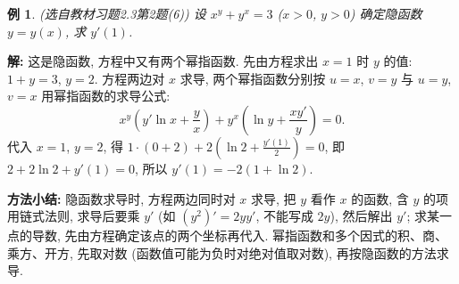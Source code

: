 \documentclass[UTF8,openany]{ctexbook}
\theoremstyle{chinesetextbook}
\newtheorem{example}{例}[section]
\newenvironment{cnsolution}{\par\indent\textbf{解:} \ignorespaces}{\par}
\begin{document}
\begin{example}\label{ex:c2-h3-2}
\textnormal{(选自教材习题2.3第2题(6))} 设 $x^y+y^x=3$ ($x>0$, $y>0$) 确定隐函数 $y=y(x)$, 求 $y'(1)$.
\end{example}
\begin{cnsolution}
这是隐函数, 方程中又有两个幂指函数. 先由方程求出 $x=1$ 时 $y$ 的值: $1+y=3$, $y=2$. 方程两边对 $x$ 求导, 两个幂指函数分别按 $u=x$, $v=y$ 与 $u=y$, $v=x$ 用幂指函数的求导公式:
\[
x^y\left(y'\ln x+\frac yx\right)+y^x\left(\ln y+\frac{xy'}y\right)=0.
\]
代入 $x=1$, $y=2$, 得 $\displaystyle1\cdot(0+2)+2\left(\ln2+\frac{y'(1)}2\right)=0$, 即 $2+2\ln2+y'(1)=0$, 所以 $y'(1)=-2(1+\ln2)$.
\end{cnsolution}
\par\indent\textbf{方法小结:} 隐函数求导时, 方程两边同时对 $x$ 求导, 把 $y$ 看作 $x$ 的函数, 含 $y$ 的项用链式法则, 求导后要乘 $y'$ (如 $(y^2)'=2yy'$, 不能写成 $2y$), 然后解出 $y'$; 求某一点的导数, 先由方程确定该点的两个坐标再代入. 幂指函数和多个因式的积、商、乘方、开方, 先取对数 (函数值可能为负时对绝对值取对数), 再按隐函数的方法求导.
\end{document}
